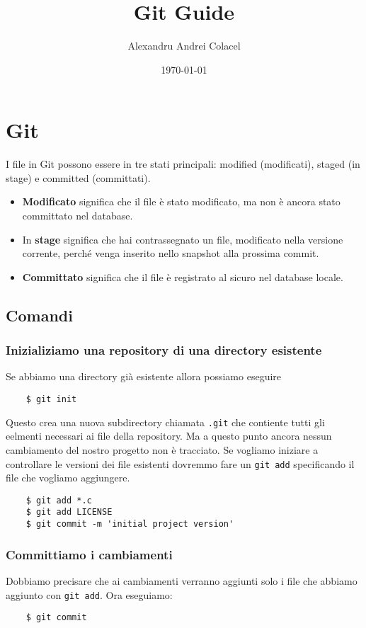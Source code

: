 \documentclass{article}
\title{Git Guide}
\author{Alexandru Andrei Colacel}
\date{\today}
\begin{document}
\maketitle


\section*{Git}
I file in Git possono essere in tre stati principali: modified (modificati), staged (in stage) e committed (committati).
\begin{itemize}
    \item \textbf{Modificato} significa che il file è stato modificato, ma non è ancora stato committato nel database. 
    \item In \textbf{stage} significa che hai contrassegnato un file, modificato nella versione corrente, perché venga inserito nello snapshot alla prossima commit. 
    \item \textbf{Committato} significa che il file è registrato al sicuro nel database locale.
\end{itemize} 


\subsection*{Comandi}
\subsubsection*{Inizializiamo una repository di una directory esistente}
Se abbiamo una directory già esistente allora possiamo eseguire
\begin{verbatim}
    $ git init
\end{verbatim}
Questo crea una nuova subdirectory chiamata \texttt{.git} che contiente tutti gli eelmenti necessari ai file della repository. Ma a questo punto ancora nessun cambiamento del nostro progetto non è tracciato.
Se vogliamo iniziare a controllare le versioni dei file esistenti dovremmo fare un \texttt{git add} specificando il file che vogliamo aggiungere.
\begin{verbatim}
    $ git add *.c
    $ git add LICENSE
    $ git commit -m 'initial project version'
\end{verbatim}



\subsubsection*{Committiamo i cambiamenti}
Dobbiamo precisare che ai cambiamenti verranno aggiunti solo i file che abbiamo aggiunto con \texttt{git add}. Ora eseguiamo: 
\begin{verbatim}
    $ git commit
\end{verbatim}
\end{document}
